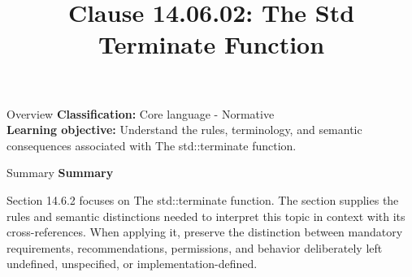 \documentclass[10pt,letterpaper]{article}
\title{Clause 14.06.02: The Std Terminate Function}
\author{}
\date{}
\begin{document}
\maketitle
\begin{CornellOverviewBox}{Overview}
\textbf{Classification:} Core language - Normative\\[2pt]
\textbf{Learning objective:} Understand the rules, terminology, and semantic consequences associated with The std::terminate function.
\end{CornellOverviewBox}\begin{CornellSummaryBox}{Summary}
{\sffamily\bfseries\color{Accent} Summary}\par\vspace{3pt}Section 14.6.2 focuses on The std::terminate function. The section supplies the rules and semantic distinctions needed to interpret this topic in context with its cross-references. When applying it, preserve the distinction between mandatory requirements, recommendations, permissions, and behavior deliberately left undefined, unspecified, or implementation-defined.
\end{CornellSummaryBox}
\end{document}
